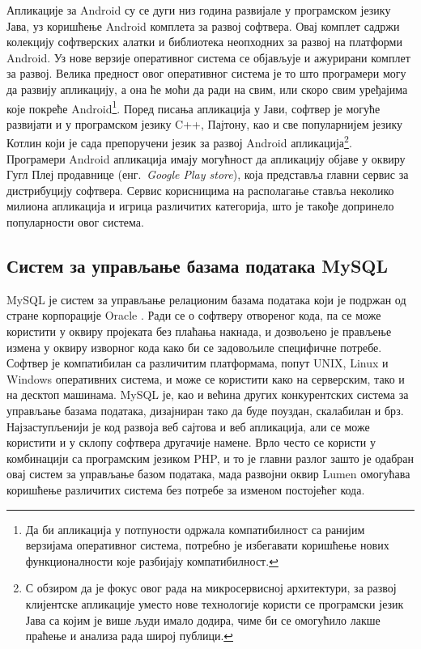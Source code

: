 \documentclass[12pt,oneside]{memoir}
\begin{document}
Апликације за Android су се дуги низ година развијале у програмском језику Јава, уз коришћење Android комплета за развој софтвера. Овај комплет садржи колекцију софтверских алатки и библиотека неопходних за развој на платформи Android. Уз нове верзије оперативног система се објављује и ажурирани комплет за развој. Велика предност овог оперативног система је то што програмери могу да развију апликацију, а она ће моћи да ради на свим, или скоро свим уређајима које покреће Android\footnote{Да би апликација у потпуности одржала компатибилност са ранијим верзијама оперативног система, потребно је избегавати коришћење нових функционалности које разбијају компатибилност.}. Поред писања апликација у Јави, софтвер је могуће развијати и у програмском језику C++, Пајтону, као и све популарнијем језику Котлин који је сада препоручени језик за развој Android апликација\footnote{С обзиром да је фокус овог рада на микросервисној архитектури, за развој клијентске апликације уместо нове технологије користи се програмски језик Јава са којим је више људи имало додира, чиме би се омогућило лакше праћење и анализа рада широј публици.}. Програмери Android апликација имају могућност да апликацију објаве у оквиру Гугл Плеј продавнице (енг.~\textit{Google Play store}), која представља главни сервис за дистрибуцију софтвера. Сервис корисницима на располагање ставља неколико милиона апликација и игрица различитих категорија, што је такође допринело популарности овог система.

\subsection{Систем за управљање базама података MySQL}
MySQL је систем за управљање релационим базама података који је подржан од стране корпорације Oracle \cite{oracle}. Ради се о софтверу отвореног кода, па се може користити у оквиру пројеката без плаћања накнада, и дозвољено је прављење измена у оквиру изворног кода како би се задовољиле специфичне потребе. Софтвер је компатибилан са различитим платформама, попут UNIX, Linux и Windows оперативних система, и може се користити како на серверским, тако и на десктоп машинама. MySQL је, као и већина других конкурентских система за управљање базама података, дизајниран тако да буде поуздан, скалабилан и брз. Најзаступљенији је код развоја веб сајтова и веб апликација, али се може користити и у склопу софтвера другачије намене. Врло често се користи у комбинацији са програмским језиком PHP, и то је главни разлог зашто је одабран овај систем за управљање базом података, мада развојни оквир Lumen омогућава коришћење различитих система без потребе за изменом постојећег кода.
\end{document}
